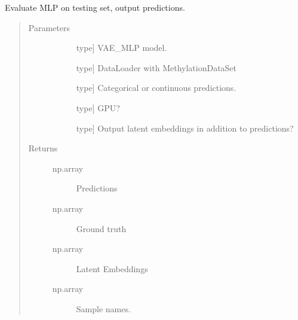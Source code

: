 \documentclass[letterpaper,10pt,english]{sphinxmanual}
\begin{document}
\begin{fulllineitems}
\label{\detokenize{index:methylnet.models.test_mlp}}
Evaluate MLP on testing set, output predictions.
\begin{quote}\begin{description}
\item[{Parameters}] \leavevmode\begin{description}
\item[{}] \leavevmode{[}type{]}
VAE\_MLP model.

\item[{}] \leavevmode{[}type{]}
DataLoader with MethylationDataSet

\item[{}] \leavevmode{[}type{]}
Categorical or continuous predictions.

\item[{}] \leavevmode{[}type{]}
GPU?

\item[{}] \leavevmode{[}type{]}
Output latent embeddings in addition to predictions?

\end{description}

\item[{Returns}] \leavevmode\begin{description}
\item[{np.array}] \leavevmode
Predictions

\item[{np.array}] \leavevmode
Ground truth

\item[{np.array}] \leavevmode
Latent Embeddings

\item[{np.array}] \leavevmode
Sample names.

\end{description}

\end{description}\end{quote}

\end{fulllineitems}

\end{document}
